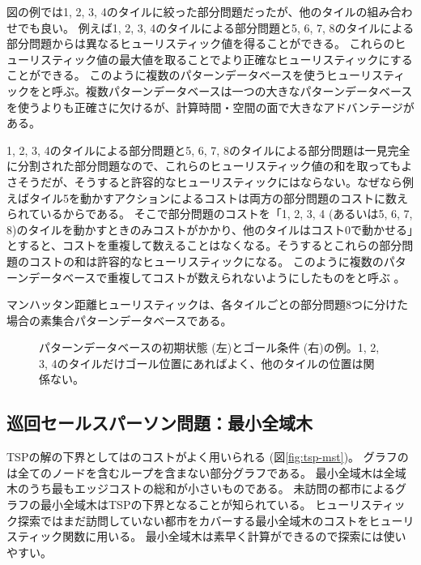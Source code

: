図の例では1, 2, 3, 4のタイルに絞った部分問題だったが、他のタイルの組み合わせでも良い。
例えば1, 2, 3, 4のタイルによる部分問題と5, 6, 7, 8のタイルによる部分問題からは異なるヒューリスティック値を得ることができる。
これらのヒューリスティック値の最大値を取ることでより正確なヒューリスティックにすることができる。
このように複数のパターンデータベースを使うヒューリスティックをと呼ぶ。複数パターンデータベースは一つの大きなパターンデータベースを使うよりも正確さに欠けるが、計算時間・空間の面で大きなアドバンテージがある。

1, 2, 3, 4のタイルによる部分問題と5, 6, 7, 8のタイルによる部分問題は一見完全に分割された部分問題なので、これらのヒューリスティック値の和を取ってもよさそうだが、そうすると許容的なヒューリスティックにはならない。なぜなら例えばタイル5を動かすアクションによるコストは両方の部分問題のコストに数えられているからである。
そこで部分問題のコストを「1, 2, 3, 4 (あるいは5, 6, 7, 8)のタイルを動かすときのみコストがかかり、他のタイルはコスト0で動かせる」とすると、コストを重複して数えることはなくなる。そうするとこれらの部分問題のコストの和は許容的なヒューリスティックになる。
このように複数のパターンデータベースで重複してコストが数えられないようにしたものをと呼ぶ \cite{korf2002}。 %

マンハッタン距離ヒューリスティックは、各タイルごとの部分問題8つに分けた場合の素集合パターンデータベースである。

\begin{figure}
  \centering
  \begin{tikzpicture}[scale=0.6]
    
  \end{tikzpicture}
\caption{パターンデータベースの初期状態 (左)とゴール条件 (右)の例。1, 2, 3, 4のタイルだけゴール位置にあればよく、他のタイルの位置は関係ない。}
\label{fig:pattern-database}
\end{figure}


\subsection{巡回セールスパーソン問題：最小全域木}
TSPの解の下界としてはのコストがよく用いられる (図\ref{fig:tsp-mst})。
グラフのは全てのノードを含むループを含まない部分グラフである。
最小全域木は全域木のうち最もエッジコストの総和が小さいものである。
未訪問の都市によるグラフの最小全域木はTSPの下界となることが知られている。
ヒューリスティック探索ではまだ訪問していない都市をカバーする最小全域木のコストをヒューリスティック関数に用いる。
最小全域木は素早く計算ができるので探索には使いやすい。


